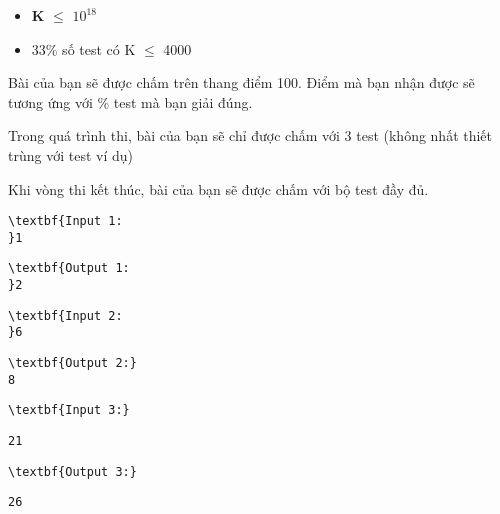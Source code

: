 \begin{itemize}
	\item \textbf{K }  $\le$  $10^{18}$
	\item 33\% số test có K  $\le$  4000
\end{itemize}
Bài của bạn sẽ được chấm trên thang điểm 100. Điểm mà bạn nhận được sẽ tương ứng với \% test mà bạn giải đúng.

Trong quá trình thi, bài của bạn sẽ chỉ được chấm với 3 test (không nhất thiết trùng với test ví dụ)

Khi vòng thi kết thúc, bài của bạn sẽ được chấm với bộ test đầy đủ.
\begin{verbatim}
\textbf{Input 1:
}1\end{verbatim}
\begin{verbatim}
\textbf{Output 1:
}2
\end{verbatim}
\begin{verbatim}
\textbf{Input 2:
}6 \end{verbatim}
\begin{verbatim}
\textbf{Output 2:}
8
\end{verbatim}
\begin{verbatim}
\textbf{Input 3:}\end{verbatim}
\begin{verbatim}
21 \end{verbatim}
\begin{verbatim}
\textbf{Output 3:}\end{verbatim}
\begin{verbatim}
26
\end{verbatim}
